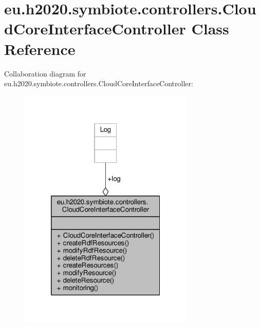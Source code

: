 \hypertarget{classeu_1_1h2020_1_1symbiote_1_1controllers_1_1CloudCoreInterfaceController}{}\section{eu.\+h2020.\+symbiote.\+controllers.\+Cloud\+Core\+Interface\+Controller Class Reference}
\label{classeu_1_1h2020_1_1symbiote_1_1controllers_1_1CloudCoreInterfaceController}


Collaboration diagram for eu.\+h2020.\+symbiote.\+controllers.\+Cloud\+Core\+Interface\+Controller\+:
\nopagebreak
\begin{figure}[H]
\begin{center}
\leavevmode
\includegraphics[width=236pt]{classeu_1_1h2020_1_1symbiote_1_1controllers_1_1CloudCoreInterfaceController__coll__graph}
\end{center}
\end{figure}
